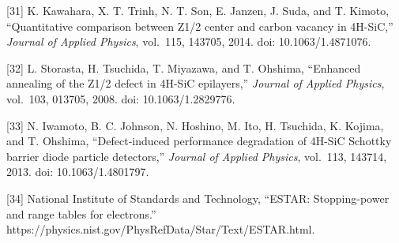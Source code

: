 \documentclass[
  10pt,
  a4paper,
]{article}
\begin{document}
{[}31{]} K. Kawahara, X. T. Trinh, N. T. Son, E. Janzen, J. Suda, and T.
Kimoto, ``Quantitative comparison between Z1/2 center and carbon vacancy
in 4H-SiC,'' \emph{Journal of Applied Physics}, vol.~115, 143705, 2014.
doi: 10.1063/1.4871076.

{[}32{]} L. Storasta, H. Tsuchida, T. Miyazawa, and T. Ohshima,
``Enhanced annealing of the Z1/2 defect in 4H-SiC epilayers,''
\emph{Journal of Applied Physics}, vol.~103, 013705, 2008. doi:
10.1063/1.2829776.

{[}33{]} N. Iwamoto, B. C. Johnson, N. Hoshino, M. Ito, H. Tsuchida, K.
Kojima, and T. Ohshima, ``Defect-induced performance degradation of
4H-SiC Schottky barrier diode particle detectors,'' \emph{Journal of
Applied Physics}, vol.~113, 143714, 2013. doi: 10.1063/1.4801797.

{[}34{]} National Institute of Standards and Technology, ``ESTAR:
Stopping-power and range tables for electrons.''
https://physics.nist.gov/PhysRefData/Star/Text/ESTAR.html.

\endgroup
\end{document}
